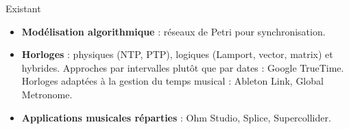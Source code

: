 \begin{block}{Existant}
	\begin{itemize}
		\item \textbf{Modélisation algorithmique} : réseaux de Petri pour synchronisation. 
		\item \textbf{Horloges} : physiques (NTP\cite{mills1991internet}, PTP\cite{peng2009research}), logiques (Lamport\cite{lamport1978time}, vector, matrix) et hybrides\cite{kulkarni2014logical}.
		Approches par intervalles plutôt que par dates : Google TrueTime.
		Horloges adaptées à la gestion du temps musical : Ableton Link, Global Metronome\cite{oda2016global}.
		\item 
		\textbf{Applications musicales réparties} : Ohm Studio, Splice, Supercollider\cite{carot2007networked}.
	\end{itemize}
\end{block}